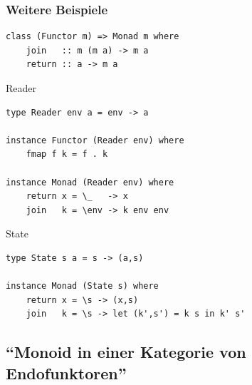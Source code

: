 \documentclass[12pt,compress,ngerman,utf8,t]{beamer}
\begin{document}

\begin{frame}[fragile]\frametitle{Weitere Beispiele}
  \vspace*{-1em}
  \begin{verbatim}
class (Functor m) => Monad m where
    join   :: m (m a) -> m a
    return :: a -> m a
  \end{verbatim}

  \begin{block}{Reader}
    \scriptsize
    \begin{verbatim}
type Reader env a = env -> a

instance Functor (Reader env) where
    fmap f k = f . k

instance Monad (Reader env) where
    return x = \_   -> x
    join   k = \env -> k env env
    \end{verbatim}
  \end{block}

  \begin{block}{State}
    \scriptsize
    \begin{verbatim}
type State s a = s -> (a,s)

instance Monad (State s) where
    return x = \s -> (x,s)
    join   k = \s -> let (k',s') = k s in k' s'
    \end{verbatim}
  \end{block}
\end{frame}



\subsection{"`Monoid in einer Kategorie von Endofunktoren"'}
\end{document}
